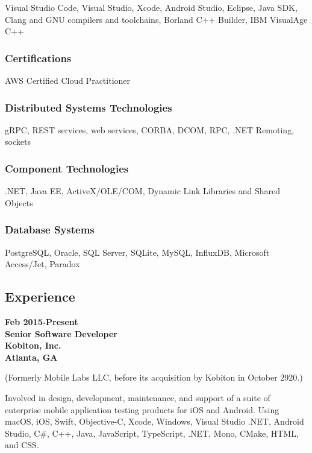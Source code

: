Visual Studio Code, Visual Studio, Xcode, Android Studio, Eclipse, Java
SDK, Clang and GNU compilers and toolchains, Borland C++ Builder, IBM
VisualAge C++

\hypertarget{certifications}{%
\subsubsection{Certifications}\label{certifications}}

AWS Certified Cloud Practitioner

\hypertarget{distributed-systems-technologies}{%
\subsubsection{Distributed Systems
Technologies}\label{distributed-systems-technologies}}

gRPC, REST services, web services, CORBA, DCOM, RPC, .NET Remoting,
sockets

\hypertarget{component-technologies}{%
\subsubsection{Component Technologies}\label{component-technologies}}

.NET, Java EE, ActiveX/OLE/COM, Dynamic Link Libraries and Shared
Objects

\hypertarget{database-systems}{%
\subsubsection{Database Systems}\label{database-systems}}

PostgreSQL, Oracle, SQL Server, SQLite, MySQL, InfluxDB, Microsoft
Access/Jet, Paradox

\hypertarget{experience}{%
\subsection{Experience}\label{experience}}

\textbf{Feb 2015-Present\\
Senior Software Developer\\
Kobiton, Inc.\\
Atlanta, GA}

(Formerly Mobile Labs LLC, before its acquisition by Kobiton in October
2920.)

Involved in design, development, maintenance, and support of a suite of
enterprise mobile application testing products for iOS and Android.
Using macOS, iOS, Swift, Objective-C, Xcode, Windows, Visual Studio
.NET, Android Studio, C\#, C++, Java, JavaScript, TypeScript, .NET,
Mono, CMake, HTML, and CSS.

